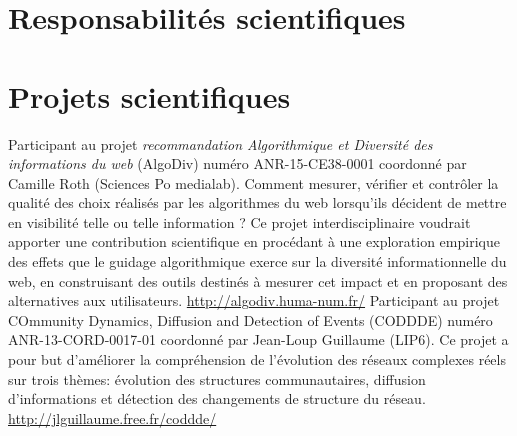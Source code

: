 \documentclass[11pt,a4paper]{moderncv}
\begin{document}

\section{Responsabilités scientifiques}

\section{Projets scientifiques}
 {Participant au projet \emph{recommandation Algorithmique et Diversité des informations du web} (AlgoDiv) numéro ANR-15-CE38-0001 coordonné par Camille Roth (Sciences Po medialab).\newline
Comment mesurer, vérifier et contrôler la qualité des choix réalisés par les algorithmes du web lorsqu’ils décident de mettre en visibilité telle ou telle information ? Ce projet interdisciplinaire voudrait apporter une contribution scientifique  en procédant à une exploration empirique des effets que le guidage algorithmique exerce sur la diversité informationnelle du web, en construisant des outils destinés à mesurer cet impact et en proposant des alternatives aux utilisateurs.
\url{http://algodiv.huma-num.fr/}}
 {Participant au projet COmmunity Dynamics, Diffusion and Detection of Events (CODDDE) numéro ANR-13-CORD-0017-01 coordonné par Jean-Loup Guillaume (LIP6).\newline
Ce projet a pour but d'améliorer la compréhension de l'évolution des réseaux complexes réels sur trois thèmes: évolution des structures communautaires, diffusion d'informations et détection des changements de structure du réseau. \url{http://jlguillaume.free.fr/coddde/}}
\end{document}
